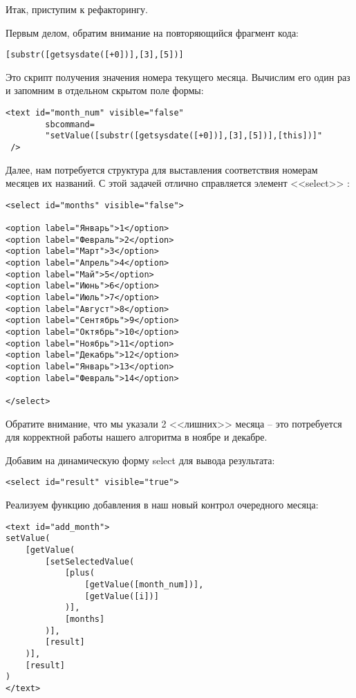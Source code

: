 \documentclass[../index.tex]{subfiles}
\begin{document}
Итак, приступим к рефакторингу.

Первым делом, обратим внимание на повторяющийся фрагмент кода:

\begin{verbatim}
[substr([getsysdate([+0])],[3],[5])]
\end{verbatim}

Это скрипт получения значения номера текущего месяца.
Вычислим его один раз и запомним в отдельном скрытом поле формы:

\begin{verbatim}
<text id="month_num" visible="false"
        sbcommand=
        "setValue([substr([getsysdate([+0])],[3],[5])],[this])]" 
 />
\end{verbatim}

Далее, нам потребуется структура для выставления соответствия номерам месяцев их названий. С этой задачей отлично справляется элемент <<select>> :

\begin{verbatim}
<select id="months" visible="false"> 

<option label="Январь">1</option>
<option label="Февраль">2</option>
<option label="Март">3</option>
<option label="Апрель">4</option>
<option label="Май">5</option>
<option label="Июнь">6</option>
<option label="Июль">7</option>
<option label="Август">8</option>
<option label="Сентябрь">9</option>
<option label="Октябрь">10</option>
<option label="Ноябрь">11</option>
<option label="Декабрь">12</option>
<option label="Январь">13</option>
<option label="Февраль">14</option>

</select>
\end{verbatim}

Обратите внимание, что мы указали 2 <<лишних>> месяца -- это потребуется для корректной работы нашего алгоритма в ноябре и декабре.

Добавим на динамическую форму select для вывода результата:
\begin{verbatim}
<select id="result" visible="true"> 
\end{verbatim}

Реализуем функцию добавления в наш новый контрол очередного месяца:

\begin{verbatim}
<text id="add_month">
setValue(
    [getValue(
        [setSelectedValue(
            [plus(
                [getValue([month_num])],
                [getValue([i])]
            )], 
            [months]
        )],
        [result]
    )],
    [result]
)
</text>
\end{verbatim}
\end{document}
